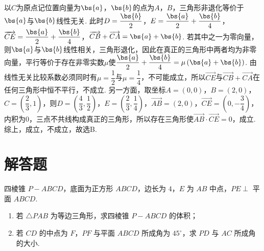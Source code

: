 \begin{solution}
以\(C\)为原点记位置向量为\(\bs{a}\)，\(\bs{b}\)的点为\(A\)，\(B\)，三角形非退化等价于\(\bs{a}\)与\(\bs{b}\)线性无关. 此时\(D=\dfrac{\bs{b}}{2}\)，\(E=\dfrac{\bs{a}}{2}+\dfrac{\bs{b}}{4}\)，\(\overrightarrow{CE}=\dfrac{\bs{a}}{2}+\dfrac{\bs{b}}{4}\)，\(\overrightarrow{CB}+\overrightarrow{CA}=\bs{a}+\bs{b}\). 若其中之一为零向量，则\(\bs{a}\)与\(\bs{b}\)线性相关，三角形退化，因此在真正的三角形中两者均为非零向量，平行等价于存在非零实数\(\mu\)使\(\dfrac{\bs{a}}{2}+\dfrac{\bs{b}}{4}=\mu\left( \bs{a}+\bs{b} \right)\). 由线性无关比较系数必须同时有\(\mu=\dfrac{1}{2}\)与\(\mu=\dfrac{1}{4}\)，不可能成立，所以\(\overrightarrow{CE}\)与\(\overrightarrow{CB}+\overrightarrow{CA}\)在任何三角形中恒不平行，不成立. 另一方面，取坐标\(A=\left( 0,0 \right)\)，\(B=\left( 2,0 \right)\)，\(C=\left( \dfrac{2}{3},1 \right)\)，则\(D=\left( \dfrac{4}{3},\dfrac{1}{2} \right)\)，\(E=\left( \dfrac{2}{3},\dfrac{1}{4} \right)\)，\(\overrightarrow{AB}=\left( 2,0 \right)\)，\(\overrightarrow{CE}=\left( 0,-\dfrac{3}{4} \right)\)，内积为\(0\)，三点不共线构成真正的三角形，所以存在三角形使\(\overrightarrow{AB}\cdot\overrightarrow{CE}=0\)，成立. 综上，成立，不成立，故选B.
\end{solution}
\section{解答题}

\begin{problem}
四棱锥 \(P-ABCD\)，底面为正方形 \(ABCD\)，边长为 \(4\)，\(E\) 为 \(AB\) 中点，\(PE\perp\) 平面 \(ABCD\).
\begin{enumerate}
\item 若 \(\triangle PAB\) 为等边三角形，求四棱锥 \(P-ABCD\) 的体积；
\item 若 \(CD\) 的中点为 \(F\)，\(PF\) 与平面 \(ABCD\) 所成角为 \(45^\circ\)，求 \(PD\) 与 \(AC\) 所成角的大小.
\end{enumerate}
\end{problem}

